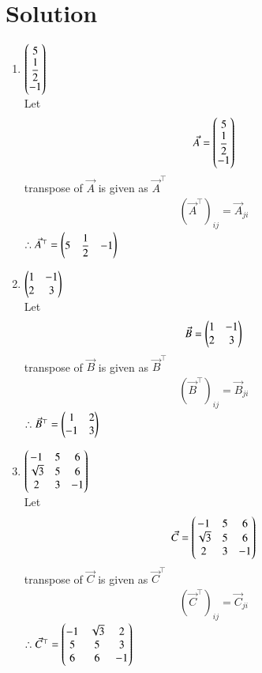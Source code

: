 \documentclass[journal,12pt,twocolumn]{IEEEtran}
\begin{document}
\section{Solution}
\begin{enumerate}
    \item $\begin{pmatrix}5\\ \dfrac{1}{2}\\-1\end{pmatrix}$\\

          Let $$\Vec{A}=\begin{pmatrix}5\\ \dfrac{1}{2}\\-1\end{pmatrix}$$
          transpose of $\Vec{A}$ is given as $\Vec{A}^{\top}$ 
\begin{align}
   (\Vec{A}^{\top})_{i j} = \Vec{A}_{j i}
\end{align}
     $ \therefore \Vec{A}^{\top} = \begin{pmatrix}5& \dfrac{1}{2}&-1\end{pmatrix}$      
    \item $\begin{pmatrix}1&-1\\2&3\end{pmatrix}$\\
    
     Let $$\Vec{B}=\begin{pmatrix}1&-1\\2&3\end{pmatrix}$$
          transpose of $\Vec{B}$ is given as $\Vec{B}^{\top}$ 
\begin{align}
   (\Vec{B}^{\top})_{i j} = \Vec{B}_{j i}
\end{align}
     $ \therefore \Vec{B}^{\top} = \begin{pmatrix}1&2\\-1&3\end{pmatrix}$ 
     
    \item $\begin{pmatrix}-1&5&6\\ \sqrt{3}&5&6\\2&3&-1\end{pmatrix}$\\
    
     Let $$\Vec{C}=\begin{pmatrix}-1&5&6\\ \sqrt{3}&5&6\\2&3&-1\end{pmatrix}$$
          transpose of $\Vec{C}$ is given as $\Vec{C}^{\top}$ 
\begin{align}
   (\Vec{C}^{\top})_{i j} = \Vec{C}_{j i}
\end{align}
     $ \therefore \Vec{C}^{\top} = \begin{pmatrix}-1& \sqrt{3}&2\\ 5&5&3\\6&6&-1\end{pmatrix}$ 
\end{enumerate}
\end{document}
